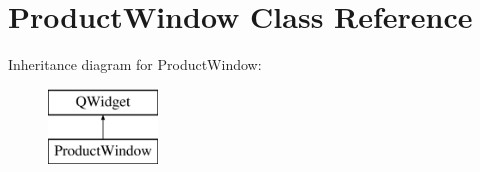 \hypertarget{class_product_window}{}\section{Product\+Window Class Reference}
\label{class_product_window}
Inheritance diagram for Product\+Window\+:\begin{figure}[H]
\begin{center}
\leavevmode
\includegraphics[height=2.000000cm]{class_product_window}
\end{center}
\end{figure}
